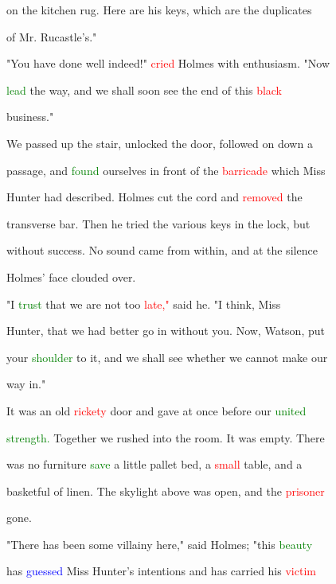  on the kitchen rug. Here are his keys, which are the duplicates

 of Mr. Rucastle's."



 "You have done well indeed!" \textcolor{red}{cried} Holmes with \textcolor{BurntOrange}{enthusiasm.} "Now

 \textcolor{green}{lead} the way, and we shall soon see the end of this \textcolor{red}{black}

 business."



 We passed up the stair, unlocked the door, followed on down a

 passage, and \textcolor{green}{found} ourselves in front of the \textcolor{red}{barricade} which Miss

 \textcolor{BurntOrange}{Hunter} had described. Holmes cut the cord and \textcolor{red}{removed} the

 transverse bar. Then he tried the various keys in the lock, but

 without \textcolor{BurntOrange}{success.} No sound came from within, and at the silence

 Holmes' face clouded over.



 "I \textcolor{green}{trust} that we are not too \textcolor{red}{late,"} said he. "I think, Miss

 \textcolor{BurntOrange}{Hunter,} that we had better go in without you. Now, Watson, put

 your \textcolor{green}{shoulder} to it, and we shall see whether we cannot make our

 way in."



 It was an old \textcolor{red}{rickety} door and gave at once before our \textcolor{green}{united}

 \textcolor{green}{strength.} Together we rushed into the room. It was empty. There

 was no furniture \textcolor{green}{save} a little pallet bed, a \textcolor{red}{small} table, and a

 basketful of linen. The skylight above was open, and the \textcolor{red}{prisoner}

 gone.



 "There has been some villainy here," said Holmes; "this \textcolor{green}{beauty}

 has \textcolor{blue}{guessed} Miss \textcolor{BurntOrange}{Hunter's} intentions and has carried his \textcolor{red}{victim}


